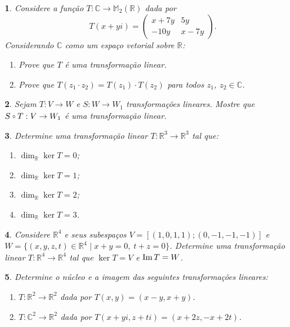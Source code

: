 \documentclass[12pt]{exam}
\newtheorem{exercicio}{}
\newcommand{\im}{{\rm Im\,}}
\newcommand{\real}{\mathbb{R}}
\newcommand{\complex}{\mathbb{C}}
\newcommand{\cp}[1]{\mathbb{#1}}
\newcommand{\compcent}[1]{\vcenter{\hbox{$#1\circ$}}}
\newcommand{\comp}{\mathbin{\mathchoice
{\compcent\scriptstyle}{\compcent\scriptstyle}
{\compcent\scriptscriptstyle}{\compcent\scriptscriptstyle}}}
\begin{document}
\begin{exercicio}
  Considere a fun\c{c}\~ao $T : \complex \to \cp{M}_2(\real)$ dada por
  \[
    T(x + yi) = \begin{pmatrix}
      x + 7y & 5y\\
      -10y & x - 7y
    \end{pmatrix}.
  \]
  Considerando $\complex$ como um espa\c{c}o vetorial sobre $\real$:
  \begin{enumerate}[label=({\alph*})]
    \item Prove que $T$ \'e uma transforma\c{c}\~ao linear.
    \item Prove que $T(z_1\cdot z_2) = T(z_1)\cdot T(z_2)$ para todos $z_1$, $z_2 \in \complex$.
  \end{enumerate}
\end{exercicio}

\begin{exercicio}
  Sejam $T : V \to W$ e $S : W \to W_1$ transforma\c{c}\~oes lineares. Mostre que $S \comp T : V \to W_1$ \'e uma transforma\c{c}\~ao linear.
\end{exercicio}

\begin{exercicio}
  Determine uma transforma\c{c}\~ao linear $T : \real^3 \to \real^3$ tal que:
  \begin{enumerate}[label=({\alph*})]
    \item $\dim_\real \ker T = 0$;
    \item $\dim_\real \ker T = 1$;
    \item $\dim_\real \ker T = 2$;
    \item $\dim_\real \ker T = 3$.
  \end{enumerate}
\end{exercicio}

\begin{exercicio}
  Considere $\real^4$ e seus subespa\c{c}os $V = [(1,0,1,1);(0,-1,-1,-1)]$ e $W = \{(x,y,z,t) \in \real^4 \mid x + y = 0,\ t + z = 0\}$. Determine uma transforma\c{c}\~ao linear $T : \real^4 \to \real^4$ tal que $\ker T = V$ e $\im T = W$.
\end{exercicio}

\begin{exercicio}
  Determine o n\'ucleo e a imagem das seguintes transforma\c{c}\~oes lineares:
  \begin{enumerate}[label=({\alph*})]
    \item $T : \real^2 \to \real^2$ dada por $T(x,y) = (x - y, x + y)$.
    \item $T : \complex^2 \to \real^2$ dada por $T(x + yi,z + ti) = (x + 2z, -x + 2t)$.
  \end{enumerate}
\end{exercicio}
\end{document}
